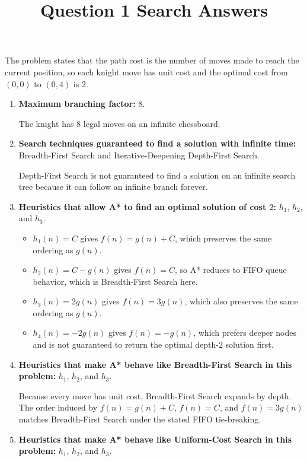 \documentclass[11pt]{article}
\title{Question 1 Search Answers}
\date{}
\begin{document}
\maketitle

The problem states that the path cost is the number of moves made to reach the current position, so each knight move has unit cost and the optimal cost from $(0,0)$ to $(0,4)$ is $2$.

\begin{enumerate}
\item \textbf{Maximum branching factor:} $8$.

The knight has $8$ legal moves on an infinite chessboard.

\item \textbf{Search techniques guaranteed to find a solution with infinite time:} Breadth-First Search and Iterative-Deepening Depth-First Search.

Depth-First Search is not guaranteed to find a solution on an infinite search tree because it can follow an infinite branch forever.

\item \textbf{Heuristics that allow A* to find an optimal solution of cost $2$:} $h_1$, $h_2$, and $h_3$.

\begin{itemize}
\item $h_1(n)=C$ gives $f(n)=g(n)+C$, which preserves the same ordering as $g(n)$.
\item $h_2(n)=C-g(n)$ gives $f(n)=C$, so A* reduces to FIFO queue behavior, which is Breadth-First Search here.
\item $h_3(n)=2g(n)$ gives $f(n)=3g(n)$, which also preserves the same ordering as $g(n)$.
\item $h_4(n)=-2g(n)$ gives $f(n)=-g(n)$, which prefers deeper nodes and is not guaranteed to return the optimal depth-$2$ solution first.
\end{itemize}

\item \textbf{Heuristics that make A* behave like Breadth-First Search in this problem:} $h_1$, $h_2$, and $h_3$.

Because every move has unit cost, Breadth-First Search expands by depth. The order induced by $f(n)=g(n)+C$, $f(n)=C$, and $f(n)=3g(n)$ matches Breadth-First Search under the stated FIFO tie-breaking.

\item \textbf{Heuristics that make A* behave like Uniform-Cost Search in this problem:} $h_1$, $h_2$, and $h_3$.


\end{enumerate}
\end{document}
